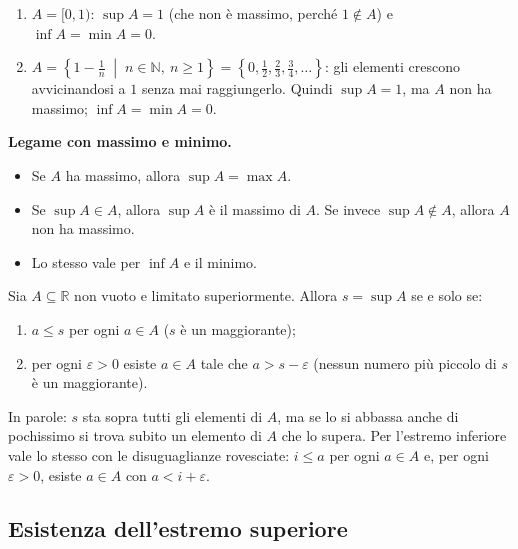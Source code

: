 \documentclass[11pt,a4paper]{article}
\begin{document}
\begin{esempio}
\leavevmode
\begin{enumerate}
    \item $A = [0, 1)$: $\sup A = 1$ (che non è massimo, perché $1 \notin A$)
          e $\inf A = \min A = 0$.
    \item $A = \left\{ 1 - \frac{1}{n} \;\middle|\; n \in \mathbb{N},\
          n \geq 1 \right\} = \left\{ 0, \frac12, \frac23, \frac34, \dots
          \right\}$: gli elementi crescono avvicinandosi a $1$ senza mai
          raggiungerlo. Quindi $\sup A = 1$, ma $A$ non ha massimo;
          $\inf A = \min A = 0$.
\end{enumerate}
\end{esempio}

\textbf{Legame con massimo e minimo.}
\begin{itemize}
    \item Se $A$ ha massimo, allora $\sup A = \max A$.
    \item Se $\sup A \in A$, allora $\sup A$ è il massimo di $A$. Se invece
          $\sup A \notin A$, allora $A$ non ha massimo.
    \item Lo stesso vale per $\inf A$ e il minimo.
\end{itemize}

\begin{teorema}
Sia $A \subseteq \mathbb{R}$ non vuoto e limitato superiormente. Allora
$s = \sup A$ se e solo se:
\begin{enumerate}
    \item $a \leq s$ per ogni $a \in A$ \quad ($s$ è un maggiorante);
    \item per ogni $\varepsilon > 0$ esiste $a \in A$ tale che
          $a > s - \varepsilon$ \quad (nessun numero più piccolo di $s$ è
          un maggiorante).
\end{enumerate}
\end{teorema}

In parole: $s$ sta sopra tutti gli elementi di $A$, ma se lo si abbassa
anche di pochissimo si trova subito un elemento di $A$ che lo supera. Per
l'estremo inferiore vale lo stesso con le disuguaglianze rovesciate:
$i \leq a$ per ogni $a \in A$ e, per ogni $\varepsilon > 0$, esiste
$a \in A$ con $a < i + \varepsilon$.

\subsection{Esistenza dell'estremo superiore}
\end{document}

